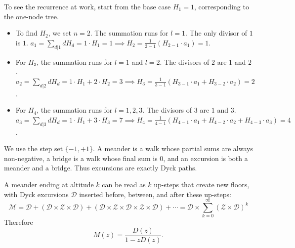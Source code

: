 To see the recurrence at work, start from the base case $H_{1} = 1$, corresponding to the
one-node tree.
\begin{itemize}
    \item To find $H_{2}$, we set $n = 2$. The summation runs for $l = 1$. The only divisor of $1$ is $1$.
        $a_{1} = \sum_{d|1} d H_{d} = 1 \cdot H_{1} = 1 \implies
        H_{2} = \frac{1}{2 - 1}(H_{2 - 1} \cdot a_{1}) = 1$.
    \item For $H_{3}$, the summation runs for $l = 1$ and $l = 2$. The divisors of $2$ are $1$ and $2$.
        $a_{2} = \sum_{d|2} d H_{d} = 1 \cdot H_{1} + 2 \cdot H_{2} = 3 \implies
        H_{3} = \frac{1}{3 - 1}(H_{3 - 1} \cdot a_{1} + H_{3 - 2} \cdot a_{2}) = 2$.
    \item For $H_{4}$, the summation runs for $l = 1, 2, 3$. The divisors of $3$ are $1$ and $3$.
        $a_{3} = \sum_{d|3} d H_{d} = 1 \cdot H_{1} + 3 \cdot H_{3} = 7 \implies
        H_{4} = \frac{1}{4 - 1}(H_{4 - 1} \cdot a_{1} + H_{4 - 2} \cdot a_{2} + H_{4 - 3} \cdot a_{3}) = 4$.
\end{itemize}


We use the step set $\{-1, +1\}$. A meander is a walk whose partial sums are always
non-negative, a bridge is a walk whose final sum is $0$, and an excursion is both a meander
and a bridge. Thus excursions are exactly Dyck paths.

A meander ending at altitude $k$ can be read as $k$ up-steps that create new floors, with Dyck
excursions $\mathcal{D}$ inserted before, between, and after these up-steps:
\begin{equation*}
    \mathcal{M}
        = \mathcal{D}
            + (\mathcal{D} \times \mathcal{Z} \times \mathcal{D})
            + (\mathcal{D} \times \mathcal{Z} \times \mathcal{D} \times \mathcal{Z} \times \mathcal{D})
            + \cdots
        = \mathcal{D} \times \sum_{k = 0}^{\infty}(\mathcal{Z} \times \mathcal{D})^{k}
\end{equation*}
Therefore
\begin{equation*}
    M(z) = \frac{D(z)}{1 - zD(z)}.
\end{equation*}

